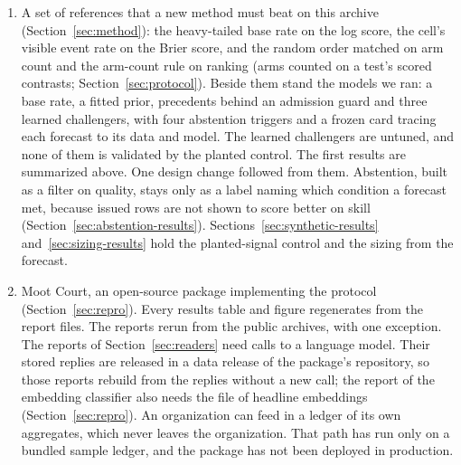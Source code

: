 \documentclass[sigconf,nonacm]{acmart}
\newif\iftmlr
\begin{document}
\begin{enumerate}
\item A set of references that a new method must beat on this archive (Section~\ref{sec:method}): the heavy-tailed base rate on the log score, the cell's visible event rate on the Brier score, and the random order matched on arm count and the arm-count rule on ranking (arms counted on a test's scored contrasts; Section~\ref{sec:protocol}). Beside them stand the models we ran: a base rate, a fitted prior, precedents behind an admission guard and three learned challengers, with four abstention triggers and a frozen card tracing each forecast to its data and model\iftmlr{} (the triggers and the card are in Appendix~\ref{sec:card-loop})\else\fi. The learned challengers are untuned, and none of them is validated by the planted control. The first results are summarized above. One design change followed from them. Abstention, built as a filter on quality, stays only as a label naming which condition a forecast met, because issued rows are not shown to score better on skill (Section~\ref{sec:abstention-results}). Sections~\ref{sec:synthetic-results} and~\ref{sec:sizing-results} hold the planted-signal control and the sizing from the forecast.
\item Moot Court, an open-source package implementing the protocol (Section~\ref{sec:repro}). Every results table and figure regenerates from the report files. The reports rerun from the public archives, with one exception. The reports of Section~\ref{sec:readers} need calls to a language model. Their stored replies are released \iftmlr{}in the supplementary material\else{}in a data release of the package's repository\fi{}, so those reports rebuild from the replies without a new call; the report of the embedding classifier also needs the file of headline embeddings (Section~\ref{sec:repro}). An organization can feed in a ledger of its own aggregates, which never leaves the organization. That path has run only on a bundled sample ledger, and the package has not been deployed in production.

\end{enumerate}
\end{document}
